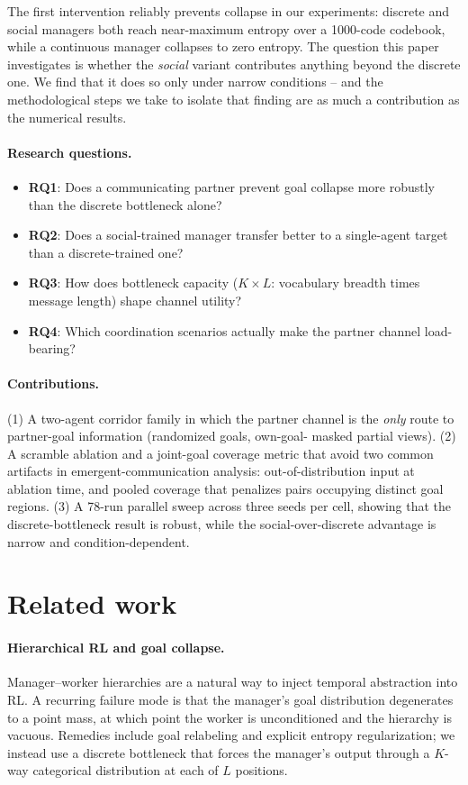 \documentclass{article}
\begin{document}
The first intervention reliably prevents collapse in our experiments:
discrete and social managers both reach near-maximum entropy over a
1000-code codebook, while a continuous manager collapses to zero entropy.
The question this paper investigates is whether the \emph{social} variant
contributes anything beyond the discrete one. We find that it does so only
under narrow conditions -- and the methodological steps we take to isolate
that finding are as much a contribution as the numerical results.

\paragraph{Research questions.}
\begin{itemize}[nosep,leftmargin=*]
\item \textbf{RQ1}: Does a communicating partner prevent goal collapse more
robustly than the discrete bottleneck alone?
\item \textbf{RQ2}: Does a social-trained manager transfer better to a
single-agent target than a discrete-trained one?
\item \textbf{RQ3}: How does bottleneck capacity ($K \times L$: vocabulary
breadth times message length) shape channel utility?
\item \textbf{RQ4}: Which coordination scenarios actually make the partner
channel load-bearing?
\end{itemize}

\paragraph{Contributions.}
(1) A two-agent corridor family in which the partner channel is the
\emph{only} route to partner-goal information (randomized goals, own-goal-
masked partial views). (2) A scramble ablation and a joint-goal coverage
metric that avoid two common artifacts in emergent-communication analysis:
out-of-distribution input at ablation time, and pooled coverage that
penalizes pairs occupying distinct goal regions. (3) A 78-run parallel
sweep across three seeds per cell, showing that the discrete-bottleneck
result is robust, while the social-over-discrete advantage is narrow and
condition-dependent.

\section{Related work}

\paragraph{Hierarchical RL and goal collapse.} Manager--worker hierarchies
\citep{vezhnevets2017feudal,nachum2018hiro,bacon2017option} are a natural
way to inject temporal abstraction into RL. A recurring failure mode is
that the manager's goal distribution degenerates to a point mass, at which
point the worker is unconditioned and the hierarchy is vacuous. Remedies
include goal relabeling \citep{nachum2018hiro} and explicit entropy
regularization; we instead use a discrete bottleneck that forces the
manager's output through a $K$-way categorical distribution at each of
$L$ positions.
\end{document}
